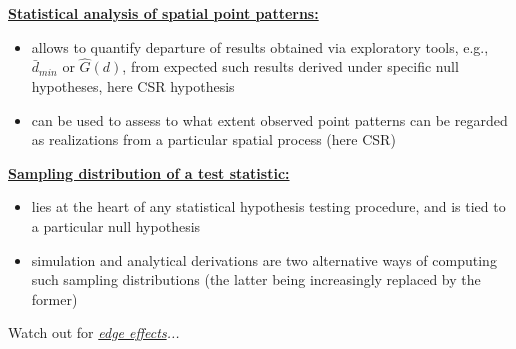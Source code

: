 \documentclass[portrait]{seminar}
\begin{document}
%
%
\begin{slide*}
\begin{center}
 \vspace*{-0.5cm} 
\end{center}

\vspace{0.5cm}\underline{\textbf{Statistical analysis of spatial
point patterns:}}
\begin{itemize}
\item allows to quantify departure of results obtained via
exploratory tools, e.g., $\bar{d}_{min}$ or $\hat{G}(d)$, from
expected such results derived under specific null hypotheses, here
CSR hypothesis
\item can be used to assess to what extent observed point patterns
can be regarded as realizations from a particular spatial process
(here CSR)
\end{itemize}

\vspace{0.5cm} \underline{\textbf{Sampling distribution of a test
statistic:}}
\begin{itemize}
\item lies at the heart of any statistical hypothesis testing
procedure, and is tied to a particular null hypothesis
\item simulation and analytical derivations are two alternative ways
of computing such sampling distributions (the latter being
increasingly replaced by the former)
\end{itemize}

\vspace{0.5cm}
\begin{center}
Watch out for \emph{\underline{edge effects}...}
\end{center}



\end{slide*}
\end{document}
